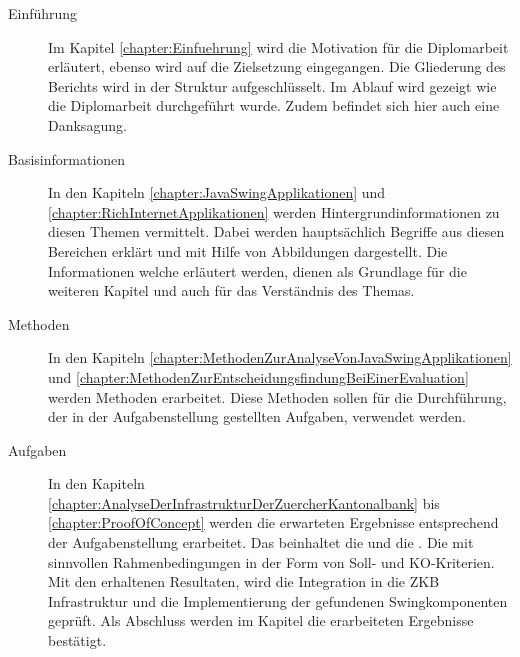   \begin{description}
    
  \item[Einführung]
  
  Im Kapitel \ref{chapter:Einfuehrung}  wird die
  Motivation für die Diplomarbeit erläutert, ebenso wird auf die Zielsetzung
  eingegangen. Die Gliederung des Berichts wird in der Struktur
  aufgeschlüsselt. Im Ablauf wird gezeigt wie die Diplomarbeit durchgeführt
  wurde. Zudem befindet sich hier auch eine Danksagung.
  
  \item[Basisinformationen]
    
  In den Kapiteln 
  \ref{chapter:JavaSwingApplikationen} 
  und \ref{chapter:RichInternetApplikationen}
   werden Hintergrundinformationen
  zu diesen Themen vermittelt. Dabei werden hauptsächlich Begriffe aus diesen
  Bereichen erklärt und mit Hilfe von Abbildungen dargestellt. Die
  Informationen welche erläutert werden, dienen als Grundlage für die weiteren
  Kapitel und auch für das Verständnis des Themas.

  \item[Methoden]
  
  In den Kapiteln
  \ref{chapter:MethodenZurAnalyseVonJavaSwingApplikationen}
   und
  \ref{chapter:MethodenZurEntscheidungsfindungBeiEinerEvaluation}
   werden
  Methoden erarbeitet. Diese Methoden sollen für die Durchführung, der in der
  Aufgabenstellung gestellten Aufgaben, verwendet werden.
  
  \item[Aufgaben]
  
  In den Kapiteln \ref{chapter:AnalyseDerInfrastrukturDerZuercherKantonalbank}
  bis \ref{chapter:ProofOfConcept} werden die erwarteten Ergebnisse
  entsprechend der Aufgabenstellung erarbeitet. Das beinhaltet die
   und die
  . Die
   mit sinnvollen
  Rahmenbedingungen in der Form von Soll- und KO-Kriterien. Mit den erhaltenen
  Resultaten, wird die Integration in die ZKB Infrastruktur und die
  Implementierung der gefundenen Swingkomponenten geprüft. Als Abschluss werden
  im Kapitel  die erarbeiteten Ergebnisse
  bestätigt.
  

\end{description}
